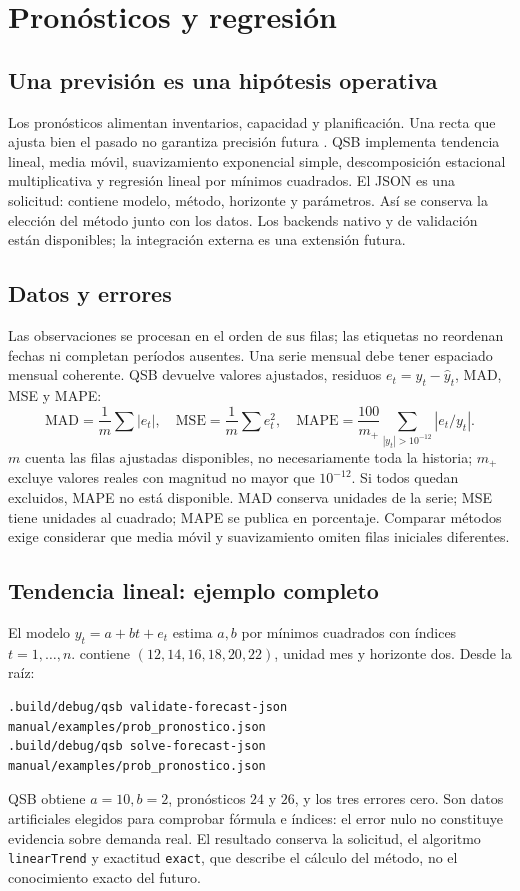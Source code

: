 \chapter{Pronósticos y regresión}
\label{ch:pronosticos}

\section{Una previsión es una hipótesis operativa}
Los pronósticos alimentan inventarios, capacidad y planificación. Una recta que
ajusta bien el pasado no garantiza precisión futura
\cite{hyndman2021forecasting}. QSB implementa tendencia lineal, media móvil,
suavizamiento exponencial simple, descomposición estacional multiplicativa y
regresión lineal por mínimos cuadrados. El JSON es una solicitud: contiene
modelo, método, horizonte y parámetros. Así se conserva la elección del método
junto con los datos. Los backends nativo y de validación están disponibles;
la integración externa es una extensión futura.

\section{Datos y errores}
Las observaciones se procesan en el orden de sus filas; las etiquetas no
reordenan fechas ni completan períodos ausentes. Una serie mensual debe tener
espaciado mensual coherente. QSB devuelve valores ajustados, residuos
\(e_t=y_t-\hat y_t\), MAD, MSE y MAPE:
\[
 \mathrm{MAD}=\frac1m\sum|e_t|,\quad
 \mathrm{MSE}=\frac1m\sum e_t^2,\quad
 \mathrm{MAPE}=\frac{100}{m_+}\sum_{|y_t|>10^{-12}}|e_t/y_t|.
\]
\(m\) cuenta las filas ajustadas disponibles, no necesariamente toda la
historia; \(m_+\) excluye valores reales con magnitud no mayor que \(10^{-12}\).
Si todos quedan excluidos, MAPE no
está disponible. MAD conserva unidades de la serie; MSE tiene unidades al
cuadrado; MAPE se publica en porcentaje. Comparar métodos exige considerar
que media móvil y suavizamiento omiten filas iniciales diferentes.

\section{Tendencia lineal: ejemplo completo}
El modelo \(y_t=a+bt+e_t\) estima \(a,b\) por mínimos cuadrados con índices
\(t=1,\ldots,n\).  contiene
\((12,14,16,18,20,22)\), unidad mes y horizonte dos. Desde la raíz:
\begin{lstlisting}
.build/debug/qsb validate-forecast-json manual/examples/prob_pronostico.json
.build/debug/qsb solve-forecast-json manual/examples/prob_pronostico.json
\end{lstlisting}
QSB obtiene \(a=10,b=2\), pronósticos \(24\) y \(26\), y los tres errores
cero. Son datos artificiales elegidos para comprobar fórmula e índices: el
error nulo no constituye evidencia sobre demanda real. El resultado conserva
la solicitud, el algoritmo \texttt{linearTrend} y exactitud
\texttt{exact}, que describe el cálculo del método, no el conocimiento exacto
del futuro.

